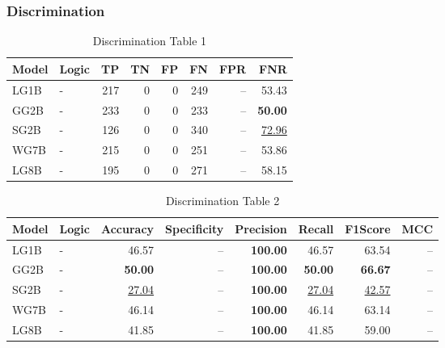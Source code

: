 \documentclass{article}
\begin{document}

\subsubsection{Discrimination}

\begin{table}[H]
\centering
\begin{tabular}{llrrrrrr}
\toprule
 Model          & Logic   &   TP &   TN &   FP &   FN &   FPR &   FNR \\
\midrule

 LG1B    & -       &  217 &    0 &    0 &  249 & --    & 53.43             \\
 GG2B    & -       &  233 &    0 &    0 &  233 & --    & \textbf{50.00}    \\
 SG2B    & -       &  126 &    0 &    0 &  340 & --    & \underline{72.96} \\
 WG7B    & -       &  215 &    0 &    0 &  251 & --    & 53.86             \\
 LG8B    & -       &  195 &    0 &    0 &  271 & --    & 58.15             \\

\bottomrule
\end{tabular}
\caption{\label{tab:widgets}Discrimination Table 1}
\end{table}

\begin{table}[H]
\begin{tabular}{llrrrrrr}
\toprule
 Model          & Logic   &   Accuracy &   Specificity &   Precision &   Recall &   F1Score &      MCC \\
\midrule

 LG1B    & -       & 46.57             & --            & \textbf{100.00} & 46.57             & 63.54             & --    \\
 GG2B    & -       & \textbf{50.00}    & --            & \textbf{100.00} & \textbf{50.00}    & \textbf{66.67}    & --    \\
 SG2B    & -       & \underline{27.04} & --            & \textbf{100.00} & \underline{27.04} & \underline{42.57} & --    \\
 WG7B    & -       & 46.14             & --            & \textbf{100.00} & 46.14             & 63.14             & --    \\
 LG8B    & -       & 41.85             & --            & \textbf{100.00} & 41.85             & 59.00             & --    \\

\bottomrule
\end{tabular}
\caption{\label{tab:xstest2}Discrimination Table 2}
\end{table}
\end{document}
